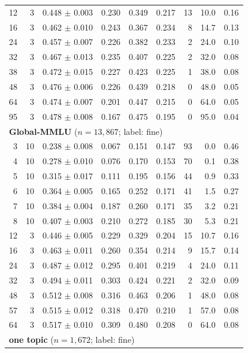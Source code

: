 \begin{longtable}{rrrrrrrrr}
12 & 3 & 0.448 $\pm$ 0.003 & 0.230 & 0.349 & 0.217 & 13 & 10.0 & 0.16 \\
16 & 3 & 0.462 $\pm$ 0.010 & 0.243 & 0.367 & 0.234 & 8 & 14.7 & 0.13 \\
24 & 3 & 0.457 $\pm$ 0.007 & 0.226 & 0.382 & 0.233 & 2 & 24.0 & 0.10 \\
32 & 3 & 0.467 $\pm$ 0.013 & 0.235 & 0.407 & 0.225 & 2 & 32.0 & 0.08 \\
38 & 3 & 0.472 $\pm$ 0.015 & 0.227 & 0.423 & 0.225 & 1 & 38.0 & 0.08 \\
48 & 3 & 0.476 $\pm$ 0.006 & 0.226 & 0.439 & 0.218 & 0 & 48.0 & 0.05 \\
64 & 3 & 0.474 $\pm$ 0.007 & 0.201 & 0.447 & 0.215 & 0 & 64.0 & 0.05 \\
95 & 3 & 0.478 $\pm$ 0.008 & 0.167 & 0.475 & 0.195 & 0 & 95.0 & 0.04 \\
\midrule
\multicolumn{9}{l}{\textbf{Global-MMLU} ($n = 13,867$; label: fine)} \\
\midrule
3 & 10 & 0.238 $\pm$ 0.008 & 0.067 & 0.151 & 0.147 & 93 & 0.0 & 0.46 \\
4 & 10 & 0.278 $\pm$ 0.010 & 0.076 & 0.170 & 0.153 & 70 & 0.1 & 0.38 \\
5 & 10 & 0.315 $\pm$ 0.017 & 0.111 & 0.195 & 0.156 & 44 & 0.9 & 0.33 \\
6 & 10 & 0.364 $\pm$ 0.005 & 0.165 & 0.252 & 0.171 & 41 & 1.5 & 0.27 \\
7 & 10 & 0.384 $\pm$ 0.004 & 0.187 & 0.260 & 0.171 & 35 & 3.2 & 0.21 \\
8 & 10 & 0.407 $\pm$ 0.003 & 0.210 & 0.272 & 0.185 & 30 & 5.3 & 0.21 \\
12 & 3 & 0.446 $\pm$ 0.005 & 0.229 & 0.329 & 0.204 & 15 & 10.7 & 0.16 \\
16 & 3 & 0.463 $\pm$ 0.011 & 0.260 & 0.354 & 0.214 & 9 & 15.7 & 0.14 \\
24 & 3 & 0.487 $\pm$ 0.012 & 0.295 & 0.401 & 0.219 & 4 & 24.0 & 0.11 \\
32 & 3 & 0.494 $\pm$ 0.011 & 0.303 & 0.424 & 0.221 & 2 & 32.0 & 0.09 \\
48 & 3 & 0.512 $\pm$ 0.008 & 0.316 & 0.463 & 0.206 & 1 & 48.0 & 0.08 \\
57 & 3 & 0.515 $\pm$ 0.012 & 0.318 & 0.470 & 0.210 & 1 & 57.0 & 0.08 \\
64 & 3 & 0.517 $\pm$ 0.010 & 0.309 & 0.480 & 0.208 & 0 & 64.0 & 0.08 \\
\midrule
\multicolumn{9}{l}{\textbf{one topic} ($n = 1,672$; label: fine)} \\

\end{longtable}
